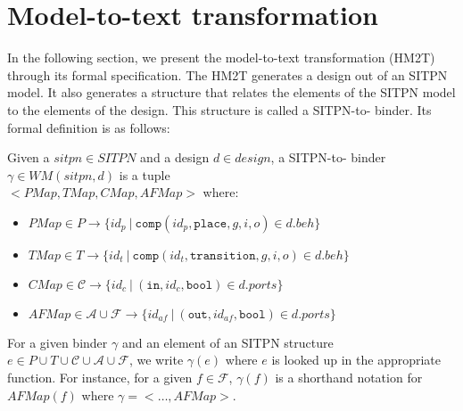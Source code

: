 \section{Model-to-text transformation}
\label{sec:m2t}

In the following section, we present the \hilecop{} model-to-text
transformation (HM2T) through its formal specification.  The HM2T
generates a \hvhdl{} design out of an SITPN model. It also generates a
structure that relates the elements of the SITPN model to the elements
of the \hvhdl{} design. This structure is called a SITPN-to-\hvhdl{}
binder.  Its formal definition is as follows:

\begin{definition}
  \label{def:sitpn-to-hvhdl-binder}
  Given a $sitpn\in{}SITPN$ and a \hvhdl{} design $d\in{}design$, a
  SITPN-to-\hvhdl{} binder $\gamma\in{}WM(sitpn,d)$ is a tuple\\
  ${<}PMap,TMap,CMap,AFMap{>}$ where:
  \begin{itemize}
  \item $PMap\in{}P\rightarrow{}\{id_p~|~\mathtt{comp}(id_p,\mathtt{place},g,i,o)\in{}d.beh\}$
  \item $TMap\in{}T\rightarrow{}\{id_t~|~\mathtt{comp}(id_t,\mathtt{transition},g,i,o)\in{}d.beh\}$
  \item $CMap\in\mathcal{C}\rightarrow\{id_c~|~(\mathtt{in}, id_c, \mathtt{bool})\in{}d.ports\}$
  \item $AFMap\in\mathcal{A}\cup\mathcal{F}\rightarrow\{id_{af}~|~(\mathtt{out}, id_{af}, \mathtt{bool})\in{}d.ports\}$
  \end{itemize}
\end{definition}

For a given binder $\gamma$ and an element of an SITPN structure
$e\in{}P\cup{}T\cup\mathcal{C}\cup\mathcal{A}\cup\mathcal{F}$, we
write $\gamma(e)$ where $e$ is looked up in the appropriate
function. For instance, for a given $f\in\mathcal{F}$, $\gamma(f)$ is
a shorthand notation for $AFMap(f)$ where $\gamma={<}\dots,AFMap{>}$.

\bigskip

